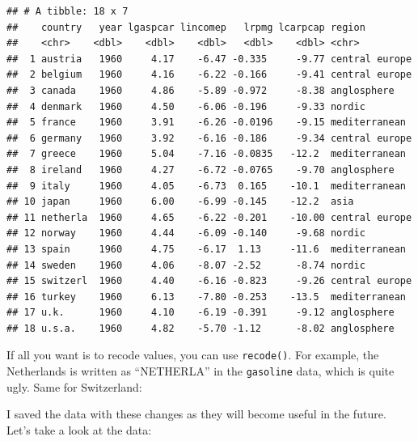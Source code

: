 \documentclass[]{gitbook}
\newenvironment{Shaded}{\begin{snugshade}}{\end{snugshade}}
\newcommand{\DataTypeTok}[1]{\textcolor[rgb]{0.13,0.29,0.53}{#1}}
\newcommand{\KeywordTok}[1]{\textcolor[rgb]{0.13,0.29,0.53}{\textbf{#1}}}
\newcommand{\NormalTok}[1]{#1}
\newcommand{\OperatorTok}[1]{\textcolor[rgb]{0.81,0.36,0.00}{\textbf{#1}}}
\newcommand{\StringTok}[1]{\textcolor[rgb]{0.31,0.60,0.02}{#1}}
\theoremstyle{definition}
\theoremstyle{definition}
\theoremstyle{definition}
\theoremstyle{remark}
\begin{document}
\begin{verbatim}
## # A tibble: 18 x 7
##    country   year lgaspcar lincomep   lrpmg lcarpcap region        
##    <chr>    <dbl>    <dbl>    <dbl>   <dbl>    <dbl> <chr>         
##  1 austria   1960     4.17    -6.47 -0.335     -9.77 central europe
##  2 belgium   1960     4.16    -6.22 -0.166     -9.41 central europe
##  3 canada    1960     4.86    -5.89 -0.972     -8.38 anglosphere   
##  4 denmark   1960     4.50    -6.06 -0.196     -9.33 nordic        
##  5 france    1960     3.91    -6.26 -0.0196    -9.15 mediterranean 
##  6 germany   1960     3.92    -6.16 -0.186     -9.34 central europe
##  7 greece    1960     5.04    -7.16 -0.0835   -12.2  mediterranean 
##  8 ireland   1960     4.27    -6.72 -0.0765    -9.70 anglosphere   
##  9 italy     1960     4.05    -6.73  0.165    -10.1  mediterranean 
## 10 japan     1960     6.00    -6.99 -0.145    -12.2  asia          
## 11 netherla  1960     4.65    -6.22 -0.201    -10.00 central europe
## 12 norway    1960     4.44    -6.09 -0.140     -9.68 nordic        
## 13 spain     1960     4.75    -6.17  1.13     -11.6  mediterranean 
## 14 sweden    1960     4.06    -8.07 -2.52      -8.74 nordic        
## 15 switzerl  1960     4.40    -6.16 -0.823     -9.26 central europe
## 16 turkey    1960     6.13    -7.80 -0.253    -13.5  mediterranean 
## 17 u.k.      1960     4.10    -6.19 -0.391     -9.12 anglosphere   
## 18 u.s.a.    1960     4.82    -5.70 -1.12      -8.02 anglosphere
\end{verbatim}

If all you want is to recode values, you can use \texttt{recode()}. For
example, the Netherlands is written as ``NETHERLA'' in the
\texttt{gasoline} data, which is quite ugly. Same for Switzerland:

\begin{Shaded}
\end{Shaded}

I saved the data with these changes as they will become useful in the
future. Let's take a look at the data:
\end{document}
